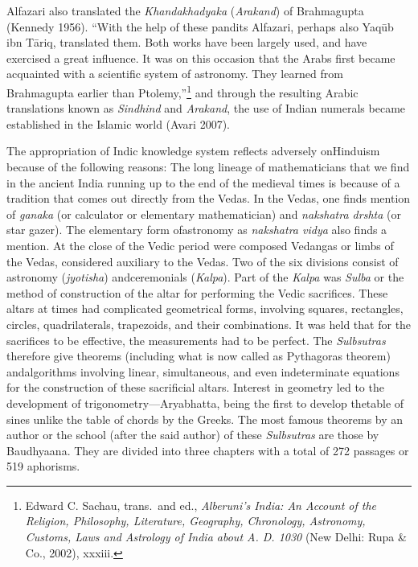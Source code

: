 Alfazari also translated the \textit{Khandakhadyaka} (\textit{Arakand}) of Brahmagupta (Kennedy 1956). “With the help of these pandits Alfazari, perhaps also Yaqūb ibn Tāriq, translated them. Both works have been largely used, and have exercised a great influence. It was on this occasion that the Arabs first became acquainted with a scientific system of astronomy. They learned from Brahmagupta earlier than Ptolemy,”\footnote{Edward C. Sachau, trans.\ and ed., \textit{Alberuni's 	India: An Account of the Religion, Philosophy, Literature, 	Geography, Chronology, Astronomy, Customs, Laws and Astrology of India about A. D. 1030}  (New Delhi: Rupa \& Co., 2002), xxxiii.} and through the resulting Arabic translations known as \textit{Sindhind} and \textit{Arakand}, the use of Indian numerals became established in the Islamic world (Avari 2007).

The appropriation of Indic knowledge system reflects adversely on\break Hinduism because of the following reasons: The long lineage of mathematicians that we find in the ancient India running up to the end of the medieval times is because of a tradition that comes out directly from the Vedas. In the Vedas, one finds mention of \textit{ganaka} (or calculator or elementary mathematician) and \textit{nakshatra drshta} (or star gazer). The elementary form of\break astronomy as \textit{nakshatra vidya} also finds a mention. At the close of the Vedic period were composed Vedangas or limbs of the Vedas, considered auxiliary to the Vedas. Two of the six divisions consist of astronomy (\textit{jyotisha}) and\break ceremonials (\textit{Kalpa}). Part of the \textit{Kalpa} was \textit{Sulba} or the method of construction of the altar for performing the Vedic sacrifices. These altars at times had complicated geometrical forms, involving squares, rectangles, circles, quadrilaterals, trapezoids, and their combinations. It was held that for the sacrifices to be effective, the measurements had to be perfect. The \textit{Sulbsutras} therefore give theorems (including what is now called as Pythagoras theorem) and\break algorithms involving linear, simultaneous, and even indeterminate equations for the construction of these sacrificial altars. Interest in geometry led to the development of trigonometry—Aryabhatta, being the first to develop the\break table of sines unlike the table of chords by the Greeks. The most famous theorems by an author or the school (after the said author) of these \textit{Sulbsutras} are those by Baudhyaana. They are divided into three chapters with a total of 272 passages or 519 aphorisms.
\eject

